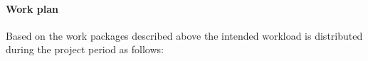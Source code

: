 \documentclass[enabledeprecatedfontcommands,cleardoublepage=empty,headsepline,twoside,11pt,DIV=15,BCOR=12mm,final]{scrartcl}
\begin{document}
%

\paragraph{Work plan}
Based on the work packages described above the intended workload is distributed during the project period as follows:\\
\end{document}
